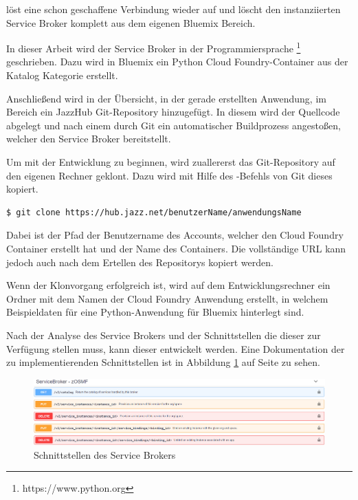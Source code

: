  löst eine schon geschaffene Verbindung wieder auf und  löscht den instanziierten Service
Broker komplett aus dem eigenen Bluemix Bereich.

In dieser Arbeit wird der Service Broker in der Programmiersprache \footnote{https://www.python.org}
geschrieben. Dazu wird in Bluemix ein Python Cloud Foundry-Container aus der Katalog Kategorie
 erstellt.

Anschließend wird in der Übersicht, in der gerade erstellten Anwendung, im Bereich  ein JazzHub
Git-Repository hinzugefügt. In diesem wird der Quellcode abgelegt und nach einem  durch Git ein automatischer
Buildprozess angestoßen, welcher den Service Broker bereitstellt.

Um mit der Entwicklung zu beginnen, wird zuallererst das Git-Repository auf den eigenen Rechner geklont. Dazu wird mit
Hilfe des -Befehls von Git dieses kopiert.

\begin{lstlisting}[language=bash, caption=Git-Repository Klonen, label=Git-Repository Klonen]
   $ git clone https://hub.jazz.net/benutzerName/anwendungsName
\end{lstlisting}

Dabei ist der Pfad  der Benutzername des Accounts, welcher den Cloud Foundry Container erstellt hat
und  der Name des Containers. Die vollständige URL kann jedoch auch nach dem Ertellen des Repositorys
kopiert werden.

Wenn der Klonvorgang erfolgreich ist, wird auf dem Entwicklungsrechner ein Ordner mit dem Namen der Cloud Foundry
Anwendung erstellt, in welchem Beispieldaten für eine Python-Anwendung für Bluemix hinterlegt sind.

Nach der Analyse des Service Brokers und der Schnittstellen die dieser zur Verfügung stellen muss, kann dieser entwickelt
werden. Eine Dokumentation der zu implementierenden Schnittstellen ist in  Abbildung \ref{fig:swagger_servicebroker} auf
Seite \pageref{fig:swagger_servicebroker} zu sehen.

\begin{figure}[h]
  \centering
    \includegraphics[scale=0.38]{images/kapitel_3/swagger_servicebroker.png}
  \caption{Schnittstellen des Service Brokers}
  \label{fig:swagger_servicebroker}
\end{figure}

